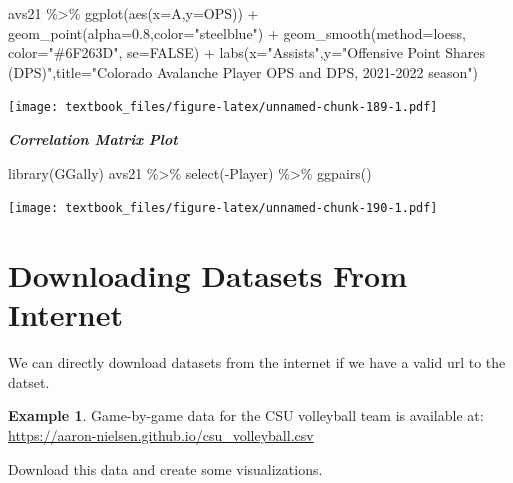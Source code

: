 \documentclass[
  11pt,
]{book}
\newenvironment{Shaded}{\begin{snugshade}}{\end{snugshade}}
\newcommand{\AttributeTok}[1]{\textcolor[rgb]{0.77,0.63,0.00}{#1}}
\newcommand{\ConstantTok}[1]{\textcolor[rgb]{0.00,0.00,0.00}{#1}}
\newcommand{\FloatTok}[1]{\textcolor[rgb]{0.00,0.00,0.81}{#1}}
\newcommand{\FunctionTok}[1]{\textcolor[rgb]{0.00,0.00,0.00}{#1}}
\newcommand{\NormalTok}[1]{#1}
\newcommand{\SpecialCharTok}[1]{\textcolor[rgb]{0.00,0.00,0.00}{#1}}
\newcommand{\StringTok}[1]{\textcolor[rgb]{0.31,0.60,0.02}{#1}}
\theoremstyle{definition}
\theoremstyle{definition}
\newtheorem{example}{Example}[chapter]
\theoremstyle{definition}
\theoremstyle{definition}
\theoremstyle{remark}
\begin{document}
\begin{Shaded}
\begin{Highlighting}[]
\NormalTok{avs21 }\SpecialCharTok{\%\textgreater{}\%} \FunctionTok{ggplot}\NormalTok{(}\FunctionTok{aes}\NormalTok{(}\AttributeTok{x=}\NormalTok{A,}\AttributeTok{y=}\NormalTok{OPS)) }\SpecialCharTok{+} \FunctionTok{geom\_point}\NormalTok{(}\AttributeTok{alpha=}\FloatTok{0.8}\NormalTok{,}\AttributeTok{color=}\StringTok{"steelblue"}\NormalTok{) }\SpecialCharTok{+}
  \FunctionTok{geom\_smooth}\NormalTok{(}\AttributeTok{method=}\NormalTok{loess, }\AttributeTok{color=}\StringTok{"\#6F263D"}\NormalTok{, }\AttributeTok{se=}\ConstantTok{FALSE}\NormalTok{) }\SpecialCharTok{+}
  \FunctionTok{labs}\NormalTok{(}\AttributeTok{x=}\StringTok{"Assists"}\NormalTok{,}\AttributeTok{y=}\StringTok{"Offensive Point Shares (DPS)"}\NormalTok{,}\AttributeTok{title=}\StringTok{"Colorado Avalanche Player OPS and DPS, 2021{-}2022 season"}\NormalTok{)}
\end{Highlighting}
\end{Shaded}

\texttt{[image: textbook\_files/figure-latex/unnamed-chunk-189-1.pdf]}

\newpage

\textbf{\emph{Correlation Matrix Plot}}

\begin{Shaded}
\begin{Highlighting}[]
\FunctionTok{library}\NormalTok{(GGally)}
\NormalTok{avs21 }\SpecialCharTok{\%\textgreater{}\%} \FunctionTok{select}\NormalTok{(}\SpecialCharTok{{-}}\NormalTok{Player) }\SpecialCharTok{\%\textgreater{}\%} \FunctionTok{ggpairs}\NormalTok{()}
\end{Highlighting}
\end{Shaded}

\texttt{[image: textbook\_files/figure-latex/unnamed-chunk-190-1.pdf]}

\newpage

\hypertarget{downloading-datasets-from-internet}{%
\section{Downloading Datasets From Internet}\label{downloading-datasets-from-internet}}

We can directly download datasets from the internet if we have a valid url to the datset.

\begin{example}
Game-by-game data for the CSU volleyball team is available at: \url{https://aaron-nielsen.github.io/csu_volleyball.csv}

Download this data and create some visualizations.
\end{example}
\end{document}
